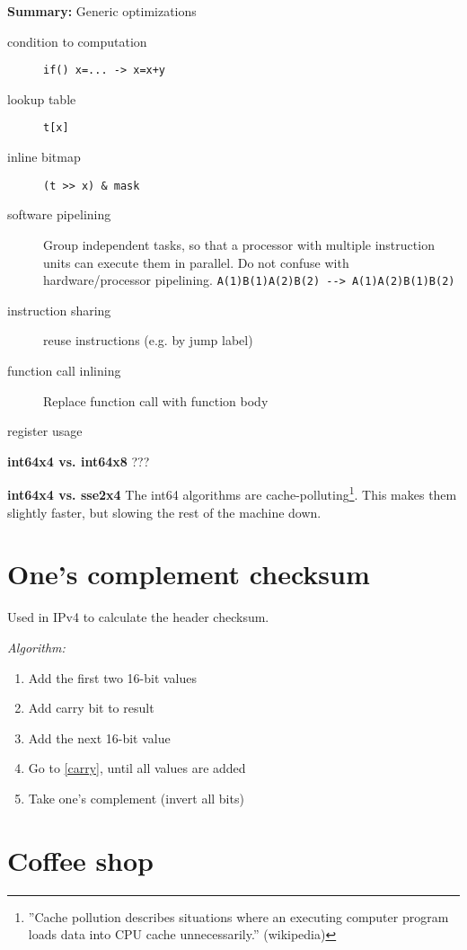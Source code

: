 \begin{shadedSmaller}
\textbf{Summary:} Generic optimizations

\begin{description}
\item[condition to computation] \lstinline|if() x=... -> x=x+y| 
\item[lookup table] \lstinline|t[x]|
\item[inline bitmap] \lstinline|(t >> x) & mask|
\item[software pipelining] Group independent tasks, so that a processor with multiple instruction units can execute them in parallel. Do not confuse with hardware/processor pipelining. \lstinline|A(1)B(1)A(2)B(2) --> A(1)A(2)B(1)B(2)|
\item[instruction sharing] reuse instructions (e.g. by jump label)
\item[function call inlining] Replace function call with function body
\item[register usage] 
\end{description}
\end{shadedSmaller}

\textbf{int64x4 vs. int64x8} ???

\textbf{int64x4 vs. sse2x4} The int64 algorithms are cache-polluting\footnote{''Cache pollution describes situations where an executing computer program loads data into CPU cache unnecessarily.'' (wikipedia)}. This makes them slightly faster, but slowing the rest of the machine down. 




\section{One's complement checksum}

Used in IPv4 to calculate the header checksum.

\textit{Algorithm:} 
\begin{enumerate}
\item Add the first two 16-bit values
\item\label{carry} Add carry bit to result
\item Add the next 16-bit value
\item Go to \ref{carry}, until all values are added
\item Take one's complement (invert all bits)
\end{enumerate}

\section{Coffee shop}

